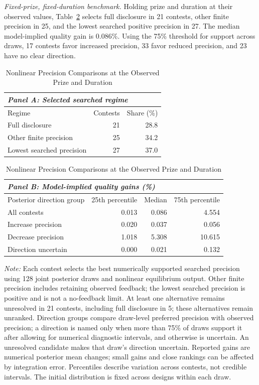 \textit{Fixed-prize, fixed-duration benchmark.} Holding prize and duration at their observed values, Table~\ref{tab-fixed-precision} selects full disclosure in 21 contests, other finite precision in 25, and the lowest searched positive precision in 27. The median model-implied quality gain is 0.086\%. Using the 75\% threshold for support across draws, 17 contests favor increased precision, 33 favor reduced precision, and 23 have no clear direction.

\begin{table}[!htbp]
\centering
\caption{Nonlinear Precision Comparisons at the Observed Prize and Duration}
\label{tab-fixed-precision}
{\small
\begin{tabularx}{\textwidth}{Xrr}
\multicolumn{3}{l}{\textit{Panel A: Selected searched regime}}\\
\midrule
Regime & Contests & Share (\%)\\
\midrule
Full disclosure & 21 & 28.8 \\
Other finite precision & 25 & 34.2 \\
Lowest searched precision & 27 & 37.0 \\
\bottomrule
\end{tabularx}
\vspace{2ex}
\begin{tabularx}{\textwidth}{Xrrr}
\multicolumn{4}{l}{\textit{Panel B: Model-implied quality gains (\%)}}\\
\midrule
Posterior direction group & 25th percentile & Median & 75th percentile\\
\midrule
All contests & 0.013 & 0.086 & 4.554\\
Increase precision & 0.020 & 0.037 & 0.056\\
Decrease precision & 1.018 & 5.308 & 10.615\\
Direction uncertain & 0.000 & 0.021 & 0.132\\
\bottomrule
\end{tabularx}}
\begin{minipage}{\textwidth}
\footnotesize\textit{Note:} Each contest selects the best numerically supported searched precision using 128 joint posterior draws and nonlinear equilibrium output. Other finite precision includes retaining observed feedback; the lowest searched precision is positive and is not a no-feedback limit. At least one alternative remains unresolved in 21 contests, including full disclosure in 5; these alternatives remain unranked. Direction groups compare draw-level preferred precision with observed precision; a direction is named only when more than 75\% of draws support it after allowing for numerical diagnostic intervals, and otherwise is uncertain. An unresolved candidate makes that draw's direction uncertain. Reported gains are numerical posterior mean changes; small gains and close rankings can be affected by integration error. Percentiles describe variation across contests, not credible intervals. The initial distribution is fixed across designs within each draw.
\end{minipage}
\end{table}

